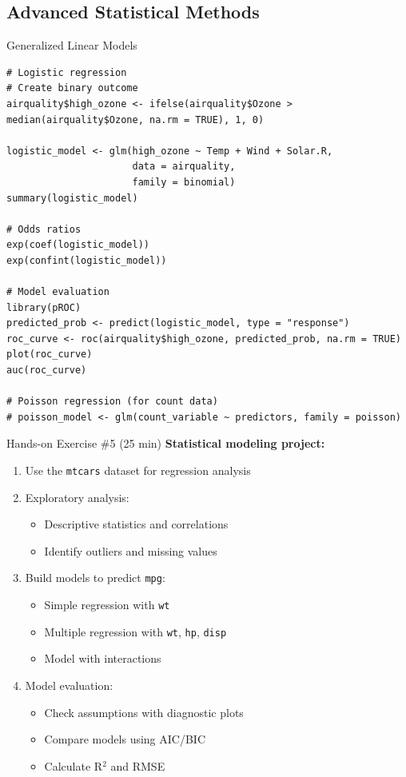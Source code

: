 \documentclass[aspectratio=169]{beamer}
\begin{document}
\subsection{Advanced Statistical Methods}

\begin{frame}[fragile]{Generalized Linear Models}
\begin{lstlisting}
# Logistic regression
# Create binary outcome
airquality$high_ozone <- ifelse(airquality$Ozone > median(airquality$Ozone, na.rm = TRUE), 1, 0)

logistic_model <- glm(high_ozone ~ Temp + Wind + Solar.R,
                      data = airquality,
                      family = binomial)
summary(logistic_model)

# Odds ratios
exp(coef(logistic_model))
exp(confint(logistic_model))

# Model evaluation
library(pROC)
predicted_prob <- predict(logistic_model, type = "response")
roc_curve <- roc(airquality$high_ozone, predicted_prob, na.rm = TRUE)
plot(roc_curve)
auc(roc_curve)

# Poisson regression (for count data)
# poisson_model <- glm(count_variable ~ predictors, family = poisson)
\end{lstlisting}
\end{frame}

\begin{frame}{Hands-on Exercise \#5 (25 min)}
  \textbf{Statistical modeling project:}
  \begin{enumerate}
    \item Use the \texttt{mtcars} dataset for regression analysis
    \item Exploratory analysis:
      \begin{itemize}
        \item Descriptive statistics and correlations
        \item Identify outliers and missing values
      \end{itemize}
    \item Build models to predict \texttt{mpg}:
      \begin{itemize}
        \item Simple regression with \texttt{wt}
        \item Multiple regression with \texttt{wt}, \texttt{hp}, \texttt{disp}
        \item Model with interactions
      \end{itemize}
    \item Model evaluation:
      \begin{itemize}
        \item Check assumptions with diagnostic plots
        \item Compare models using AIC/BIC
        \item Calculate R$^2$ and RMSE
      \end{itemize}
  \end{enumerate}
\end{frame}
\end{document}
